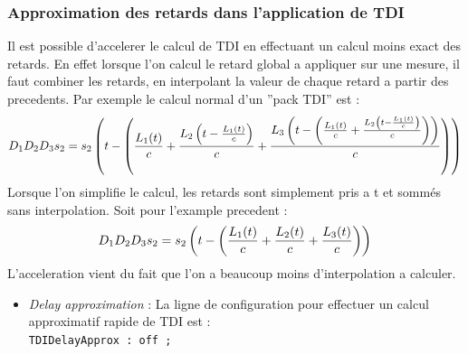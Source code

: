 \documentclass[a4paper,english,12pt]{article}
\begin{document}
\subsubsection{Approximation des retards dans l'application de TDI}
\label{SSSConfigTDIQuick}
Il est possible d'accelerer le calcul de TDI en effectuant un calcul moins exact des retards. En effet lorsque l'on calcul le retard global a appliquer sur une mesure, il faut combiner les retards, en interpolant la valeur de chaque retard a partir des precedents. Par exemple le calcul normal d'un ''pack TDI'' est : 
\begin{equation}
D_{1} D_{2} D_{3} s_{2} = s_{2} \left( t - \left(  {L_{1}(t) \over c} + {L_{2} \left(t - {L_{1}(t) \over c} \right) \over c} + {L_{3}  \left( t - \left( {L_{1}(t) \over c} + {L_{2} \left(t - {L_{1}(t) \over c} \right) \over c} \right) \right) \over c}  \right)  \right)
\end{equation}
Lorsque l'on simplifie le calcul, les retards sont simplement pris a t et somm\'es sans interpolation. Soit pour l'example precedent :
\begin{equation}
D_{1} D_{2} D_{3} s_{2} = s_{2} \left( t - \left(  {L_{1}(t) \over c} + {L_{2}(t) \over c} + {L_{3}(t)  \over c}  \right)  \right)
\end{equation}
L'acceleration vient du fait que l'on a beaucoup moins d'interpolation a calculer.\\
\begin{itemize}
\item{\it Delay approximation} :  La ligne de configuration pour effectuer un calcul approximatif rapide de TDI est : \\
\hphantom{aaaaa}\texttt{TDIDelayApprox : off ;}  \\
\end{itemize}

\end{document}
